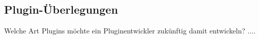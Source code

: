  \label{sec:ErsteSchritte}

\subsection{Plugin-Überlegungen}

Welche Art Plugins möchte ein Pluginentwickler zukünftig damit entwickeln?
....
